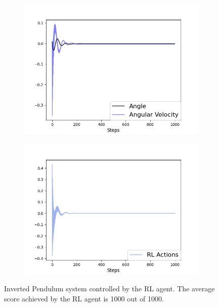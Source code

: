 \begin{figure}
\centering
\begin{subfigure}{0.4\textwidth}
  \centering
  \includegraphics[width=\linewidth]{ip_RL.png}
  \label{fig:ip_pid}
\end{subfigure}%
\begin{subfigure}{.4\textwidth}
  \centering
  \includegraphics[width=\linewidth]{ip_RL_actions.png}
  \label{fig:ip_pid_actions}
\end{subfigure}
\caption{Inverted Pendulum system controlled by the RL agent. The average score achieved by the RL agent is 1000 out of 1000.}
\label{fig:ip_rl}
\end{figure}

